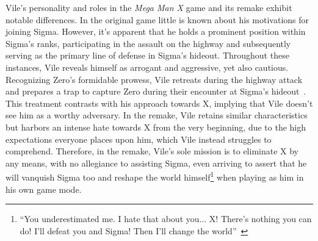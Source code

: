 Vile's personality and roles in the \textit{Mega Man X} game and its remake exhibit notable differences. In the original game little is known about his motivations for joining Sigma. However, it's apparent that he holds a prominent position within Sigma's ranks, participating in the assault on the highway and subsequently serving as the primary line of defense in Sigma's hideout. Throughout these instances, Vile reveals himself as arrogant and aggressive, yet also cautious. Recognizing Zero's formidable prowess, Vile retreats during the highway attack and prepares a trap to capture Zero during their encounter at Sigma's hideout~\cite{wiki:Vile}. This treatment contrasts with his approach towards X, implying that Vile doesn't see him as a worthy adversary. In the remake, Vile retains similar characteristics but harbors an intense hate towards X from the very beginning, due to the high expectations everyone places upon him, which Vile instead struggles to comprehend. Therefore, in the remake, Vile's sole mission is to eliminate X by any means, with no allegiance to assisting Sigma, even arriving to assert that he will vanquish Sigma too and reshape the world himself\footnote{\enquote{You underestimated me. I hate that about you... X! There's nothing you can do! I'll defeat you and Sigma! Then I'll change the world}~\cite{wiki:MMX_script}} when playing as him in his own game mode.
